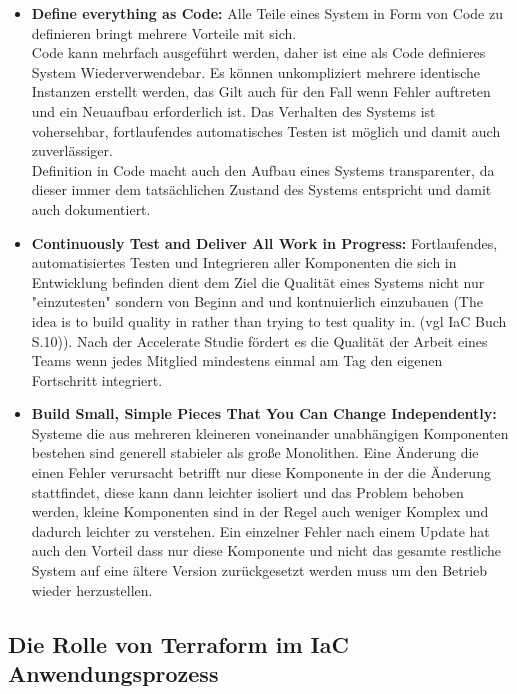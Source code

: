 \begin{itemize} 
  \item \textbf{Define everything as Code:} Alle Teile eines System
  in Form von Code zu definieren bringt mehrere Vorteile mit sich.\\
  Code kann mehrfach ausgeführt werden, daher ist eine als Code
  definieres System Wiederverwendebar. Es können unkompliziert mehrere
  identische Instanzen erstellt werden, das Gilt auch für den Fall
  wenn Fehler auftreten und ein Neuaufbau erforderlich ist.
  Das Verhalten des Systems ist vohersehbar, fortlaufendes automatisches
  Testen ist möglich und damit auch zuverlässiger.\\
  Definition in Code macht auch den Aufbau eines Systems transparenter,
  da dieser immer dem tatsächlichen Zustand des Systems entspricht und
  damit auch dokumentiert.
  
  \item \textbf{Continuously Test and Deliver All Work in Progress:} 
  Fortlaufendes, automatisiertes Testen und Integrieren aller Komponenten
  die sich in Entwicklung befinden dient dem Ziel die Qualität eines
  Systems nicht nur "einzutesten" sondern von Beginn and und kontnuierlich
  einzubauen
  (The idea is to build quality in rather than trying to test quality in.
  (vgl IaC Buch S.10)). Nach der Accelerate Studie fördert es die Qualität
  der Arbeit eines Teams wenn jedes Mitglied mindestens einmal am Tag den
  eigenen Fortschritt integriert.

  \item \textbf{Build Small, Simple Pieces That You Can Change Independently:} 
  Systeme die aus mehreren kleineren voneinander unabhängigen Komponenten
  bestehen sind generell stabieler als große Monolithen. Eine Änderung die
  einen Fehler verursacht betrifft nur diese Komponente in der die Änderung
  stattfindet, diese kann dann leichter isoliert und das Problem behoben
  werden, kleine Komponenten sind in der Regel auch weniger Komplex und
  dadurch leichter zu verstehen. Ein einzelner Fehler nach einem Update
  hat auch den Vorteil dass nur diese Komponente und nicht das gesamte
  restliche System auf eine ältere Version zurückgesetzt werden muss um
  den Betrieb wieder herzustellen.

\end{itemize}

\subsection{Die Rolle von Terraform im IaC Anwendungsprozess}

